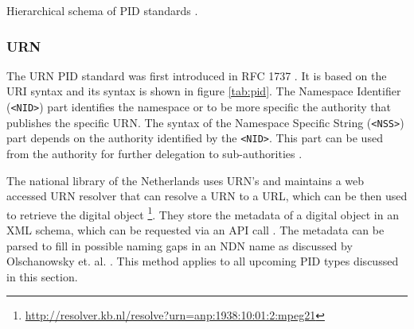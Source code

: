 \begin {table}[H]
\caption {Hierarchical schema of PID standards \cite{icn-bd}.} \label{tab:pid} 
\begin{center}
\end{center}
\end {table}


\subsubsection{URN}
The URN PID standard was first introduced in RFC 1737 \cite{rfc1737}. It is based on the URI syntax and its syntax is shown in figure \ref{tab:pid}. The Namespace Identifier (\texttt{\textless NID\textgreater}) part identifies the namespace or to be more specific the authority that publishes the specific URN.
The syntax of the Namespace Specific String (\texttt{\textless NSS\textgreater}) part depends on the authority identified by the \texttt{\textless NID\textgreater}. This part can be used from the authority for further delegation to sub-authorities \cite{icn-bd}.

The national library of the Netherlands uses URN's and maintains a web accessed URN resolver that can resolve a URN to a URL, which can be then used to retrieve the digital object \footnote{\url{http://resolver.kb.nl/resolve?urn=anp:1938:10:01:2:mpeg21}}.
They store the metadata of a digital object in an XML schema, which can be requested via an API call \cite{kb-urn}. The metadata can be parsed to fill in possible naming gaps in an NDN name as discussed by Olschanowsky et. al. \cite{ndn-clim}. This method applies to all upcoming PID types discussed in this section.


